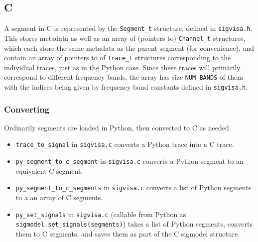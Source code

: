 \documentclass{article}
\begin{document}
\subsection{C}

A segment in C is represented by the {\tt Segment\_t} structure, defined in {\tt sigvisa.h}. This stores metadata as well as an array of (pointers to) {\tt Channel\_t} structures, which each store the same metadata as the parent segment (for convenience), and contain an array of pointers to of {\tt Trace\_t} structures corresponding to the individual traces, just as in the Python case. Since these traces will primarily correspond to different frequency bands, the array has size {\tt NUM\_BANDS} of them with the indices being given by frequency band constants defined in {\tt sigvisa.h}. 

\subsubsection{Converting}

Ordinarily segments are loaded in Python, then converted to C as needed. 

\begin{itemize}
\item {\tt trace\_to\_signal} in {\tt sigvisa.c} converts a Python trace into a C trace.
\item {\tt py\_segment\_to\_c\_segment} in {\tt sigvisa.c} converts a Python segment to an equivalent C segment.
\item {\tt py\_segment\_to\_c\_segments} in {\tt sigvisa.c} converts a list of Python segments to a an array of C segments.
\item {\tt py\_set\_signals} in {\tt sigvisa.c} (callable from Python as {\tt sigmodel.set\_signals(segments)}) takes a list of Python segments, converts them to C segments, and saves them as part of the C sigmodel structure. 
\end{itemize}
\end{document}
